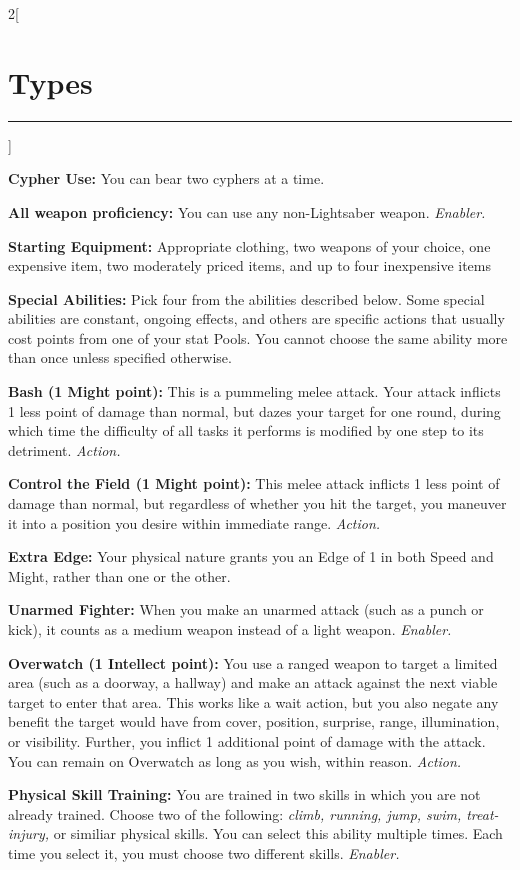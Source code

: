 \documentclass[a4paper,10pt,final]{book}
\newcommand{\HRule}{\rule{\linewidth}{0.5mm}} %
\newcommand{\newSection}[1]{\section*{#1} \addcontentsline{toc}{section}{#1} \label{sec:#1} \HRule}
\newcommand{\itemLine}[2]{\textbf{#1:} {#2}\par}
\newcommand{\itemAbility}[2]{\textcolor{25gray}{\textbullet\textbf{ #1:}} {#2}\par}
\newcommand{\enabler}{\textit{ Enabler.}}
\newcommand{\action}{\textit{ Action.}}
\newenvironment{docsection}[1]
{
  \begin{multicols*}{2}[\newSection{#1}]
}
{
  \end{multicols*}
  \newpage
}
\begin{document}
\begin{docsection}{Types}
\itemLine{Cypher Use} {You can bear two cyphers at a time.}

\itemLine{All weapon proficiency} {You can use any non-Lightsaber weapon.\enabler}

\itemLine{Starting Equipment} {Appropriate clothing, two weapons of your choice, one expensive item, two moderately priced items, and up to four inexpensive items}

\itemLine{Special Abilities} {Pick four from the abilities described below. Some special abilities are constant, ongoing effects, and others are specific actions that usually cost points from one of your stat Pools. You cannot choose the same ability more than once unless specified otherwise.}

\itemAbility{Bash (1 Might point)} {This is a pummeling melee attack. Your attack inflicts 1 less point of damage than normal, but dazes your target for one round, during which time the difficulty of all tasks it performs is modified by one step to its detriment.\action}

\itemAbility{Control the Field (1 Might point)} {This melee attack inflicts 1 less point of damage than normal, but regardless of whether you hit the target, you maneuver it into a position you desire within immediate range.\action}

\itemAbility{Extra Edge} {Your physical nature grants you an Edge of 1 in both Speed and Might, rather than one or the other.}

\itemAbility{Unarmed Fighter} {When you make an unarmed attack (such as a punch or kick), it counts as a medium weapon instead of a light weapon.\enabler}

\itemAbility{Overwatch (1 Intellect point)} {You use a ranged weapon to target a limited area (such as a doorway, a hallway) and make an attack against the next viable target to enter that area. This works like a wait action, but you also negate any benefit the target would have from cover, position, surprise, range, illumination, or visibility. Further, you inflict 1 additional point of damage with the attack. You can remain on Overwatch as long as you wish, within reason.\action}

\itemAbility{Physical Skill Training}{You are trained in two skills in which you are not already trained. Choose two of the following: \textit{climb, running, jump, swim, treat-injury,} or similiar physical skills. You can select this ability multiple times. Each time you select it, you must choose two different skills.\enabler}


\end{docsection}
\end{document}
